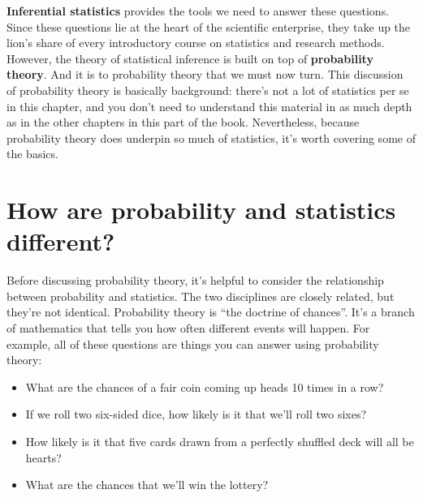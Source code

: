 \documentclass[
]{book}
\providecommand{\tightlist}{%
  \setlength{\itemsep}{0pt}\setlength{\parskip}{0pt}}
\theoremstyle{definition}
\theoremstyle{definition}
\theoremstyle{definition}
\theoremstyle{definition}
\theoremstyle{remark}
\begin{document}
\textbf{Inferential statistics} provides the tools we need to answer these questions. Since these questions lie at the heart of the scientific enterprise, they take up the lion's share of every introductory course on statistics and research methods. However, the theory of statistical inference is built on top of \textbf{probability theory}. And it is to probability theory that we must now turn. This discussion of probability theory is basically background: there's not a lot of statistics per se in this chapter, and you don't need to understand this material in as much depth as in the other chapters in this part of the book. Nevertheless, because probability theory does underpin so much of statistics, it's worth covering some of the basics.

\hypertarget{probabilitystats}{%
\section{How are probability and statistics different?}\label{probabilitystats}}

Before discussing probability theory, it's helpful to consider the relationship between probability and statistics. The two disciplines are closely related, but they're not identical. Probability theory is ``the doctrine of chances''. It's a branch of mathematics that tells you how often different events will happen. For example, all of these questions are things you can answer using probability theory:

\begin{itemize}
\tightlist
\item
  What are the chances of a fair coin coming up heads 10 times in a row?
\item
  If we roll two six-sided dice, how likely is it that we'll roll two sixes?
\item
  How likely is it that five cards drawn from a perfectly shuffled deck will all be hearts?
\item
  What are the chances that we'll win the lottery?
\end{itemize}
\end{document}
